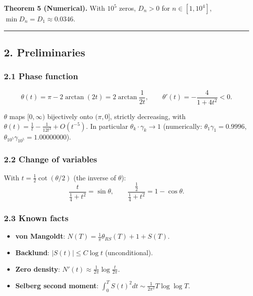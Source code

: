 \documentclass[
]{article}
\providecommand{\tightlist}{%
  \setlength{\itemsep}{0pt}\setlength{\parskip}{0pt}}
\begin{document}
\textbf{Theorem 5 (Numerical).} With \(10^5\) zeros, \(D_n > 0\) for
\(n \in [1, 10^4]\), \(\min D_n = D_1 \approx 0.0346\).

\begin{center}\rule{0.5\linewidth}{0.5pt}\end{center}

\hypertarget{preliminaries}{%
\subsection{2. Preliminaries}\label{preliminaries}}

\hypertarget{phase-function}{%
\subsubsection{2.1 Phase function}\label{phase-function}}

\[\theta(t) = \pi - 2\arctan(2t) = 2\arctan\frac{1}{2t}, \qquad \theta'(t) = -\frac{4}{1+4t^2} < 0.\]

\(\theta\) maps \([0,\infty)\) bijectively onto \((\pi,0]\), strictly
decreasing, with \(\theta(t) = \frac1t - \frac{1}{12t^3} + O(t^{-5})\).
In particular \(\theta_k\cdot\gamma_k \to 1\) (numerically:
\(\theta_1\gamma_1 = 0.9996\),
\(\theta_{10^5}\gamma_{10^5} = 1.00000000\)).

\hypertarget{change-of-variables}{%
\subsubsection{2.2 Change of variables}\label{change-of-variables}}

With \(t = \tfrac12\cot(\theta/2)\) (the inverse of \(\theta\)):
\[\frac{t}{\tfrac14+t^2} = \sin\theta, \qquad \frac{\tfrac12}{\tfrac14+t^2} = 1-\cos\theta.\]

\hypertarget{known-facts}{%
\subsubsection{2.3 Known facts}\label{known-facts}}

\begin{itemize}
\tightlist
\item
  \textbf{von Mangoldt}: \(N(T) = \tfrac1\pi\theta_{RS}(T) + 1 + S(T)\).
\item
  \textbf{Backlund}: \(|S(t)| \le C\log t\) (unconditional).
\item
  \textbf{Zero density}:
  \(N'(t) \approx \tfrac{1}{2\pi}\log\tfrac{t}{2\pi}\).
\item
  \textbf{Selberg second moment}:
  \(\int_0^T S(t)^2dt \sim \tfrac{1}{2\pi^2}T\log\log T\).
\end{itemize}
\end{document}
